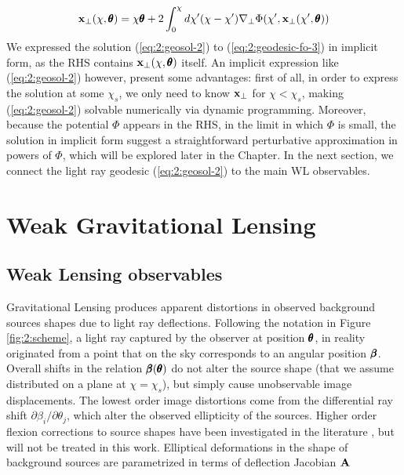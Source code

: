 \begin{equation}
\label{eq:2:geosol-2}
\mathbf{x}_\perp(\chi,\pmb{\theta}) = \chi\pmb{\theta} + 2\int_0^\chi d\chi'(\chi-\chi')\nabla_\perp\Phi(\chi',\mathbf{x}_\perp(\chi',\pmb{\theta}))
\end{equation} 
%
We expressed the solution (\ref{eq:2:geosol-2}) to (\ref{eq:2:geodesic-fo-3}) in implicit form, as the RHS contains $\mathbf{x}_\perp(\chi,\pmb{\theta})$ itself. An implicit expression like (\ref{eq:2:geosol-2}) however, present some advantages: first of all, in order to express the solution at some $\chi_s$, we only need to know $\mathbf{x}_\perp$ for $\chi<\chi_s$, making (\ref{eq:2:geosol-2}) solvable numerically via dynamic programming. Moreover, because the potential $\Phi$ appears in the RHS, in the limit in which $\Phi$ is small, the solution in implicit form suggest a straightforward perturbative approximation in powers of $\Phi$, which will be explored later in the Chapter. In the next section, we connect the light ray geodesic (\ref{eq:2:geosol-2}) to the main WL observables.  



\section{Weak Gravitational Lensing}

\subsection{Weak Lensing observables}
Gravitational Lensing produces apparent distortions in observed background sources shapes due to light ray deflections. Following the notation in Figure \ref{fig:2:scheme}, a light ray captured by the observer at position $\pmb{\theta}$, in reality originated from a point that on the sky corresponds to an angular position $\pmb{\beta}$. Overall shifts in the relation $\pmb{\beta}(\pmb{\theta})$ do not alter the source shape (that we assume distributed on a plane at $\chi=\chi_s$), but simply cause unobservable image displacements. The lowest order image distortions come from the differential ray shift $\partial \beta_i/\partial \theta_j$, which alter the observed ellipticity of the sources. Higher order flexion corrections to source shapes have been investigated in the literature \citep{BornFlexion}, but will not be treated in this work. Elliptical deformations in the shape of background sources are parametrized in terms of deflection Jacobian $\mathbf{A}$

